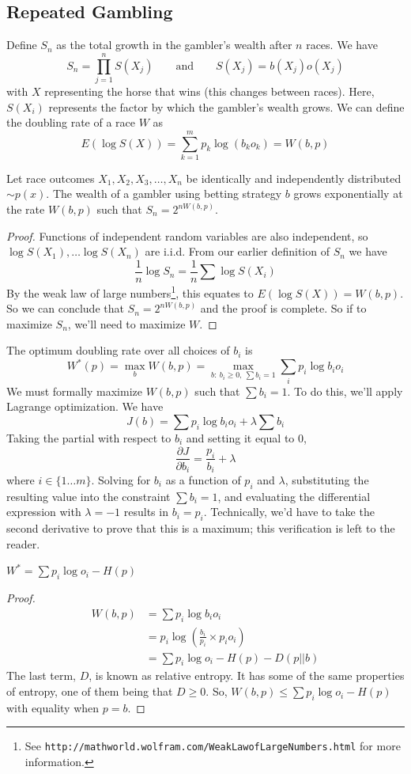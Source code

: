 \documentclass[11pt]{article}
\theoremstyle{definition}
\begin{document}
\subsection{Repeated Gambling}

Define $S_n$ as the total growth in the gambler's wealth after $n$ races. We have $$S_n = \prod_{j=1}^n S(X_j) \qquad \text{and} \qquad S(X_j) = b(X_j) o(X_j)$$with $X$ representing the horse that wins (this changes between races). Here, $S(X_i)$ represents the factor by which the gambler's wealth grows. We can define the doubling rate of a race $W$ as $$E(\log S(X)) = \sum_{k=1}^m p_k \log (b_k o_k) = W(b, p)$$

\theorem Let race outcomes $X_1, X_2, X_3, \dots, X_n$ be identically and independently distributed $\sim p(x)$. The wealth of a gambler using betting strategy $b$ grows exponentially at the rate $W(b, p)$ such that $S_n = 2^{n W(b, p)}$.

\begin{proof}
Functions of independent random variables are also independent, so $\log S(X_1), \dots \log S(X_n)$ are i.i.d. From our earlier definition of $S_n$ we have $$\frac{1}{n} \log S_n = \frac{1}{n} \sum \log S(X_i)$$By the weak law of large numbers\footnote{See \texttt{http://mathworld.wolfram.com/WeakLawofLargeNumbers.html} for more information.}, this equates to $E(\log S(X)) = W(b, p)$. So we can conclude that $S_n =  2^{n W(b, p)}$ and the proof is complete. So if to maximize $S_n$, we'll need to maximize $W$. 
\end{proof}
 The optimum doubling rate over all choices of $b_i$ is $$W^*(p) = \max_b W(b, p) = \max_{b: \: b_i \geq 0, \: \sum b_i = 1} \sum_i p_i \log b_i o_i$$We must formally maximize $W(b, p)$ such that $\sum b_i = 1$. To do this, we'll apply Lagrange optimization. We have $$J(b) = \sum p_i \log b_i o_i + \lambda \sum b_i$$Taking the partial with respect to $b_i$ and setting it equal to 0, $$\frac{\partial J}{\partial b_i} = \frac{p_i}{b_i} + \lambda$$ where $i \in \{ 1 \dots m \}$. Solving for $b_i$ as a function of $p_i$ and $\lambda$, substituting the resulting value into the constraint $\sum b_i = 1$, and evaluating the differential expression with  $\lambda = -1$ results in $b_i = p_i$. Technically, we'd have to take the second derivative to prove that this is a maximum; this verification is left to the reader. 

\theorem $W^* = \sum p_i \log o_i - H(p)$

\begin{proof}
\begin{align*}
W(b, p) &= \sum p_i \log b_i o_i  \\
&= p_i \log \left( \frac{b_i}{p_i} \times p_i o_i \right) \\
&= \sum p_i \log o_i - H(p) - D(p || b)
\end{align*}
The last term, $D$, is known as relative entropy. It has some of the same properties of entropy, one of them being that $D \geq 0$. So,  $W(b, p) \leq \sum p_i \log o_i - H(p)$ with equality when $p = b$. 
\end{proof}
\end{document}

